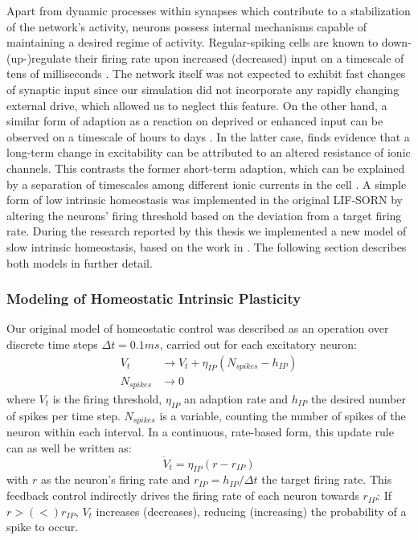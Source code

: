 \documentclass[10pt,a4paper]{article}
\begin{document}
Apart from dynamic processes within synapses which contribute to a stabilization of the network's activity, neurons possess internal mechanisms capable of maintaining a desired regime of activity. Regular-spiking cells are known to down-(up-)regulate their firing rate upon increased (decreased) input on a timescale of tens of milliseconds \cite{Connors_Gutnick_Spike_Patterns,Benda_Herz_Spike_Frequ_Adaption}. The network itself was not expected to exhibit fast changes of synaptic input since our simulation did not incorporate any rapidly changing external drive, which allowed us to neglect this feature. On the other hand, a similar form of adaption as a reaction on deprived or enhanced input can be observed on a timescale of hours to days \cite{Desai_IP}. In the latter case, \cite{Desai_IP} finds evidence that a long-term change in excitability can be attributed to an altered resistance of ionic channels. This contrasts the former short-term adaption, which can be explained by a separation of timescales among different ionic currents in the cell \cite[p.~252-256]{Izhikevich_Dynsys}. A simple form of low intrinsic homeostasis was implemented in the original LIF-SORN by altering the neurons' firing threshold based on the deviation from a target firing rate. During the research reported by this thesis we implemented a new model of slow intrinsic homeostasis, based on the work in \cite{Sweeney_Paper}. The following section describes both models in further detail.
\subsubsection{Modeling of Homeostatic Intrinsic Plasticity}
Our original model of homeostatic control was described as an operation over discrete time steps $\Delta t = 0.1ms$, carried out for each excitatory neuron:
\begin{align}
V_t &\rightarrow V_t + \eta_{IP} (N_{spikes} - h_{IP}) \label{can_hom_1}\\
N_{spikes} &\rightarrow 0 \label{can_hom_2}
\end{align}
where $V_t$ is the firing threshold, $\eta_{IP}$ an adaption rate and $h_{IP}$ the desired number of spikes per time step. $N_{spikes}$ is a variable, counting the number of spikes of the neuron within each interval. In a continuous, rate-based form, this update rule can as well be written as:
\begin{equation}
\dot{V}_t = \eta_{IP}(r-r_{IP}) \label{can_hom_rate}
\end{equation}
with $r$ as the neuron's firing rate and $r_{IP}=h_{IP}/\Delta t$ the target firing rate. This feedback control indirectly drives the firing rate of each neuron towards $r_{IP}$: If $r>(<)r_{IP}$, $V_t$ increases (decreases), reducing (increasing) the probability of a spike to occur. 
\end{document}
